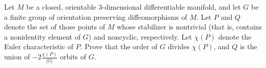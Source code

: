 Let $M$ be a closed, orientable $3$-dimensional differentiable manifold, and let $G$ be a finite group of orientation preserving diffeomorphisms of $M$. Let $P$ and $Q$ denote the set of those points of $M$ whose stabilizer is nontrivial (that is, contains a nonidentity element of $G$) and noncyclic, respectively. Let $\chi (P)$ denote the Euler characteristic of $P$. Prove that the order of $G$ divides $\chi (P)$, and $Q$ is the union of $-2\frac{\chi(P)}{|G|}$ orbits of $G$.
